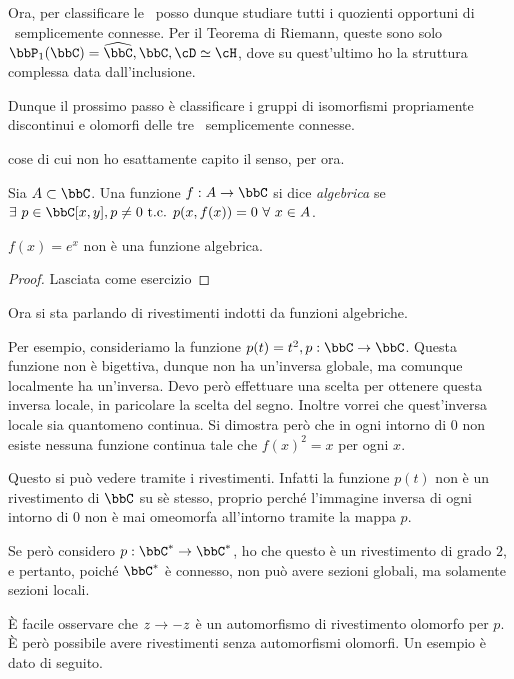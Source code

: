 Ora, per classificare le \sdR\ posso dunque studiare tutti i quozienti opportuni di \sdR\ semplicemente connesse. Per il Teorema di Riemann, queste sono solo $\bbP_1(\bbC)=\oc \bbC, \bbC, \cD\isom\cH$, dove su quest'ultimo ho la struttura complessa data dall'inclusione.

Dunque il prossimo passo è classificare i gruppi di isomorfismi propriamente discontinui e olomorfi delle tre \sdR\ semplicemente connesse.

 cose di cui non ho esattamente capito il senso, per ora.

\begin{definizione}
	Sia $A\subset\bbC$. Una funzione $f:A\rar\bbC$ si dice \emph{algebrica} se $\exists\ p\in\bbC[x,y], p\neq0 \tc p(x,f(x))=0\ \forall\ x\in A$.
\end{definizione}
\begin{lemma}
 	$f(x)=e^x$ non è una funzione algebrica.
\end{lemma}
\begin{proof}
 	Lasciata come esercizio
\end{proof}

Ora si sta parlando di rivestimenti indotti da funzioni algebriche.

Per esempio, consideriamo la funzione $p(t)=t^2, p:\bbC\rar\bbC$. Questa funzione non è bigettiva, dunque non ha un'inversa globale, ma comunque localmente ha un'inversa. Devo però effettuare una scelta per ottenere questa inversa locale, in paricolare la scelta del segno. Inoltre vorrei che quest'inversa locale sia quantomeno continua. Si dimostra però che in ogni intorno di $0$ non esiste nessuna funzione continua tale che $f(x)^2=x$ per ogni $x$.

Questo si può vedere tramite i rivestimenti. Infatti la funzione $p(t)$ non è un rivestimento di $\bbC$ su sè stesso, proprio perché l'immagine inversa di ogni intorno di $0$ non è mai omeomorfa all'intorno tramite la mappa $p$.

Se però considero $p:\bbC^*\rar\bbC^*$, ho che questo è un rivestimento di grado $2$, e pertanto, poiché $\bbC^*$ è connesso, non può avere sezioni globali, ma solamente sezioni locali.

È facile osservare che $z\rightarrow-z$ è un automorfismo di rivestimento olomorfo per $p$. È però possibile avere rivestimenti senza automorfismi olomorfi. Un esempio è dato di seguito.

